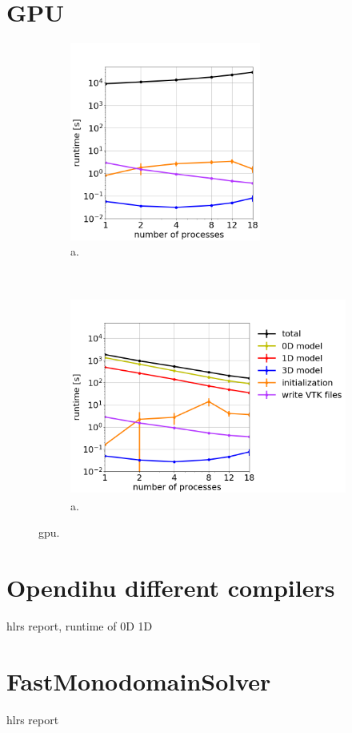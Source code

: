 \section{GPU}

\begin{figure}%
  \centering%
  \begin{subfigure}[t]{0.48\textwidth}%
    \centering%
    \includegraphics[height=6.5cm]{images/results/studies/16_hodgkin_huxley_gpu.png}%
    \caption{a.}%
    \label{fig:16_hodgkin_huxley_gpu}%
  \end{subfigure}
  \,
  \begin{subfigure}[t]{0.48\textwidth}%
    \centering%
    \includegraphics[height=6.5cm]{images/results/studies/16_hodgkin_huxley_cpu.png}%
    \caption{a.}%
    \label{fig:16_hodgkin_huxley_cpu}%
  \end{subfigure}   
  \caption{gpu.}%
  \label{fig:16_hodgkin_huxley_cpu_gpu}%
\end{figure}%

\fi
\iffalse
\section{Opendihu different compilers}
hlrs report, runtime of 0D 1D
\section{FastMonodomainSolver}
hlrs report
